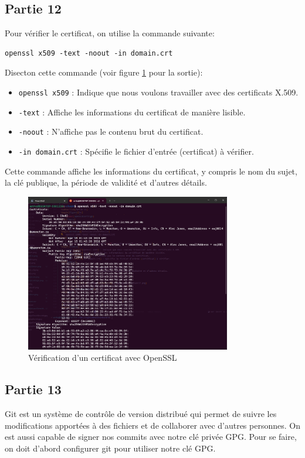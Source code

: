 \documentclass[12pt,a4paper]{article}
\begin{document}
\subsection{Partie 12}
Pour vérifier le certificat, on utilise la commande suivante:
\begin{Verbatim}[fontsize=\footnotesize]
    openssl x509 -text -noout -in domain.crt
\end{Verbatim}

Disecton cette commande (voir figure \ref{opensslCertVerif} pour la sortie):
\begin{itemize}
    \item \texttt{openssl x509} : Indique que nous voulons travailler avec des certificats X.509.
    \item \texttt{-text} : Affiche les informations du certificat de manière lisible.
    \item \texttt{-noout} : N'affiche pas le contenu brut du certificat.
    \item \texttt{-in domain.crt} : Spécifie le fichier d'entrée (certificat) à vérifier.
\end{itemize}

Cette commande affiche les informations du certificat,
y compris le nom du sujet, la clé publique, la période de validité et d'autres détails.

\begin{figure}[ht]
    \centering
    \includegraphics[width=0.8\textwidth]{../img/opensslCertVerif.png}
    \caption{Vérification d'un certificat avec OpenSSL}
    \label{opensslCertVerif}
\end{figure}

\subsection{Partie 13}
Git est un système de contrôle de version distribué qui permet de suivre
les modifications apportées à des fichiers et de collaborer avec d'autres personnes.
On est aussi capable de signer nos commits avec notre clé privée GPG.
Pour se faire, on doit d'abord configurer git pour utiliser notre clé GPG.
\end{document}
